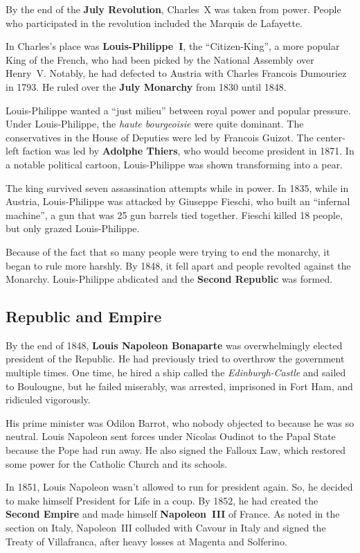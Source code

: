 By the end of the \textbf{July Revolution}, Charles~X was taken from power.
People who participated in the revolution included the Marquis de Lafayette.

In Charles's place was \textbf{Louis-Philippe~I}, the ``Citizen-King'', a more popular King of the French,
who had been picked by the National Assembly over Henry~V.
Notably, he had defected to Austria with Charles Francois Dumouriez in 1793.
He ruled over the \textbf{July Monarchy} from 1830 until 1848.

Louis-Philippe wanted a ``just milieu'' between royal power and popular pressure.
Under Louis-Philippe, the \textit{haute bourgeoisie} were quite dominant.
The conservatives in the House of Deputies were led by Francois Guizot.
The center-left faction was led by \textbf{Adolphe Thiers}, who would become president in 1871.
In a notable political cartoon, Louis-Philippe was shown transforming into a pear.

The king survived seven assassination attempts while in power.
In 1835, while in Austria, Louis-Philippe was attacked by Giuseppe Fieschi, who built an ``infernal machine'',
a gun that was 25 gun barrels tied together.
Fieschi killed 18 people, but only grazed Louis-Philippe.

Because of the fact that so many people were trying to end the monarchy, it began to rule more harshly.
By 1848, it fell apart and people revolted against the Monarchy.
Louis-Philippe abdicated and the \textbf{Second Republic} was formed.

\subsection*{Republic and Empire}

By the end of 1848, \textbf{Louis Napoleon Bonaparte} was overwhelmingly elected president of the Republic.
He had previously tried to overthrow the government multiple times.
One time, he hired a ship called the \textit{Edinburgh-Castle} and sailed to Boulougne,
but he failed miserably, was arrested, imprisoned in Fort Ham, and ridiculed vigorously.

His prime minister was Odilon Barrot, who nobody objected to because he was so neutral.
Louis Napoleon sent forces under Nicolas Oudinot to the Papal State because the Pope had run away.
He also signed the Falloux Law, which restored some power for the Catholic Church and its schools.

In 1851, Louis Napoleon wasn't allowed to run for president again.
So, he decided to make himself President for Life in a coup.
By 1852, he had created the \textbf{Second Empire} and made himself \textbf{Napoleon~III} of France.
As noted in the section on Italy, Napoleon~III colluded with Cavour in Italy and signed the Treaty of Villafranca,
after heavy losses at Magenta and Solferino.

